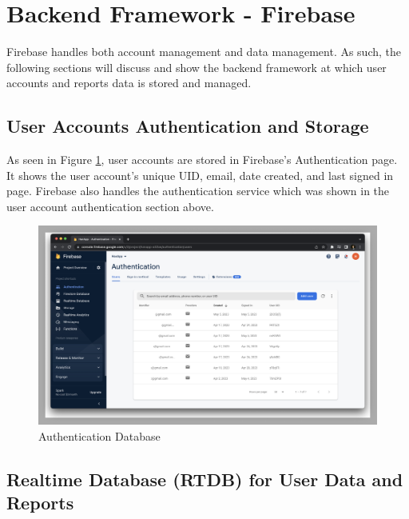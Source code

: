 \section{Backend Framework - Firebase}

Firebase handles both account management and data management. As such, the following sections will discuss and show the backend framework at which user accounts and reports data is stored and managed.

\subsection{User Accounts Authentication and Storage}

As seen in Figure \ref{fig:firebaseAuth}, user accounts are stored in Firebase's Authentication page. It shows the user account's unique UID, email, date created, and last signed in page. Firebase also handles the authentication service which was shown in the user account authentication section above.
\begin{figure}[!h]
    \centering
    \begin{minipage}[c]{1\linewidth}
        \centering
        \includegraphics[scale=0.25]{figures/Chapter4/Firebase/authentication.png}
        \caption{Authentication Database}
        \label{fig:firebaseAuth}
    \end{minipage}
\end{figure}
\subsection{Realtime Database (RTDB) for User Data and Reports}

